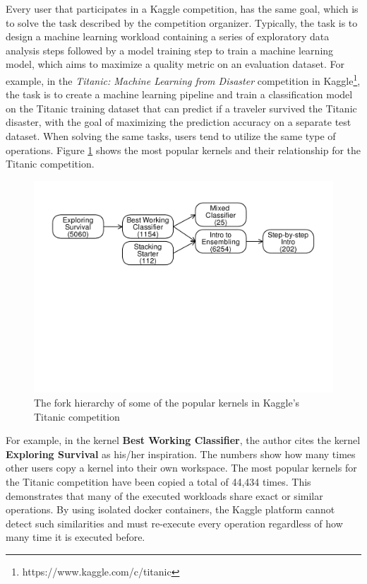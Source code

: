 Every user that participates in a Kaggle competition, has the same goal, which is to solve the task described by the competition organizer.
Typically, the task is to design a machine learning workload containing a series of exploratory data analysis steps followed by a model training step to train a machine learning model, which aims to maximize a quality metric on an evaluation dataset.
For example, in the \textit{Titanic: Machine Learning from Disaster} competition in Kaggle\footnote{https://www.kaggle.com/c/titanic}, the task is to create a machine learning pipeline and train a classification model on the Titanic training dataset that can predict if a traveler survived the Titanic disaster, with the goal of maximizing the prediction accuracy on a separate test dataset.
When solving the same tasks, users tend to utilize the same type of operations.
Figure \ref{fig-titanic-script-hierarchy} shows the most popular kernels and their relationship for the Titanic competition.
\begin{figure}
\centering
\includegraphics[width=\columnwidth]{../images/kaggle-titanic-scripts-graph}
\caption{The fork hierarchy of some of the popular kernels in Kaggle's Titanic competition}
\label{fig-titanic-script-hierarchy}
\end{figure}
For example, in the kernel \textbf{Best Working Classifier}, the author cites the kernel \textbf{Exploring Survival} as his/her inspiration.
The numbers show how many times other users copy a kernel into their own workspace.
The most popular kernels for the Titanic competition have been copied a total of 44,434 times.
This demonstrates that many of the executed workloads share exact or similar operations.
By using isolated docker containers, the Kaggle platform cannot detect such similarities and must re-execute every operation regardless of how many time it is executed before.


